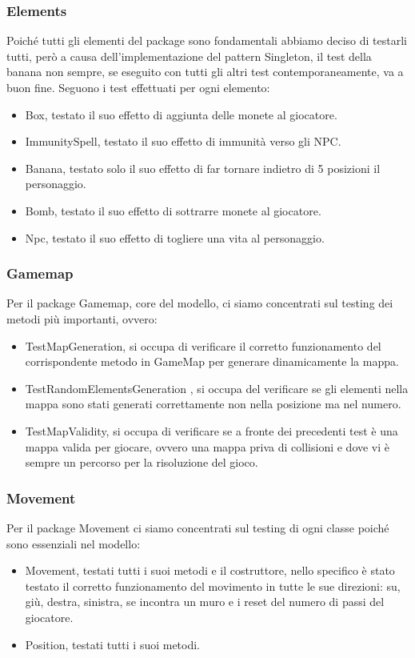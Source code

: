 \documentclass[12pt, letterpaper]{article}
\begin{document}
        \subsubsection{Elements}
            Poiché tutti gli elementi del package sono fondamentali abbiamo deciso di testarli tutti, però a causa dell'implementazione del pattern Singleton, il test della banana non sempre, se eseguito con tutti gli altri test contemporaneamente, va a buon fine.
            Seguono i test effettuati per ogni elemento:
                \begin{itemize}
                    \item Box, testato il suo effetto di aggiunta delle monete al giocatore.
                    \item ImmunitySpell, testato il suo effetto di immunità verso gli NPC.
                    \item Banana, testato solo il suo effetto di far tornare indietro di 5 posizioni il personaggio.
                    \item Bomb, testato il suo effetto di sottrarre monete al giocatore.
                    \item Npc, testato il suo effetto di togliere una vita al personaggio.
                \end{itemize}
        \subsubsection{Gamemap}
            Per il package Gamemap, core del modello, ci siamo concentrati sul testing dei metodi più importanti, ovvero:
                \begin{itemize}
                    \item TestMapGeneration, si occupa di verificare il corretto funzionamento del corrispondente metodo in GameMap per generare dinamicamente la mappa.
                    \item TestRandomElementsGeneration , si occupa del verificare se gli elementi nella mappa sono stati generati correttamente non nella posizione ma nel numero.
                    \item TestMapValidity, si occupa di verificare se a fronte dei precedenti test è una mappa valida per giocare, ovvero una mappa priva di collisioni e dove vi è sempre un percorso per la risoluzione del gioco.
                \end{itemize}
        \subsubsection{Movement}
            Per il package Movement ci siamo concentrati sul testing di ogni classe poiché sono essenziali nel modello:
                \begin{itemize}
                    \item Movement, testati tutti i suoi metodi e il costruttore, nello specifico è stato testato il corretto funzionamento del movimento in tutte le sue direzioni: su, giù, destra, sinistra, se incontra un muro e i reset del numero di passi del giocatore.
                    \item Position, testati tutti i suoi metodi.
                \end{itemize}
\end{document}
